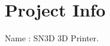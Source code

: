\hypertarget{index_INFO}{}\section{Project Info}\label{index_INFO}

\begin{DoxyItemize}
\item Name \+: S\+N3D 3D Printer. 
\end{DoxyItemize}
